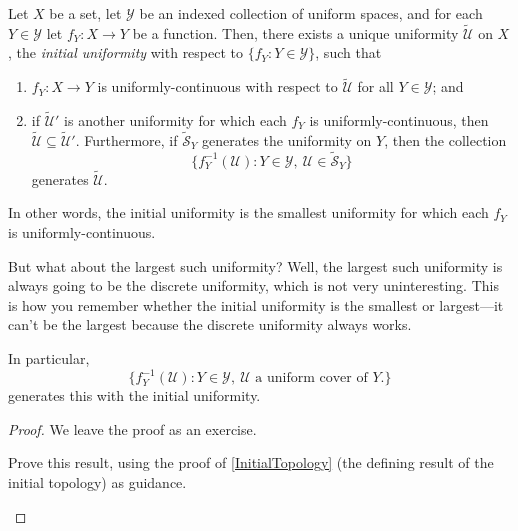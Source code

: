\begin{prp}\label{InitialUniformity}
Let $X$ be a set, let $\mathcal{Y}$ be an indexed collection of uniform spaces, and for each $Y\in \mathcal{Y}$ let $f_Y:X\rightarrow Y$ be a function.  Then, there exists a unique uniformity $\widetilde{\mathcal{U}}$ on $X$, the \emph{initial uniformity} with respect to $\{ f_Y:Y\in \mathcal{Y}\}$, such that
\begin{enumerate}
\item $f_Y:X\rightarrow Y$ is uniformly-continuous with respect to $\widetilde{\mathcal{U}}$ for all $Y\in \mathcal{Y}$; and
\item if $\widetilde{\mathcal{U}}'$ is another uniformity for which each $f_Y$ is uniformly-continuous, then $\widetilde{\mathcal{U}}\subseteq \widetilde{\mathcal{U}}'$.  Furthermore, if $\widetilde{\mathcal{S}}_Y$ generates the uniformity on $Y$, then the collection
\begin{equation}
\{ f_Y^{-1}(\mathcal{U}):Y\in \mathcal{Y},\ \mathcal{U}\in \widetilde{\mathcal{S}}_Y\}
\end{equation}
generates $\widetilde{\mathcal{U}}$.
\end{enumerate}
\begin{rmk}
In other words, the initial uniformity is the smallest uniformity for which each $f_Y$ is uniformly-continuous.
\end{rmk}
\begin{rmk}
But what about the largest such uniformity?  Well, the largest such uniformity is always going to be the discrete uniformity, which is not very uninteresting.  This is how you remember whether the initial uniformity is the smallest or largest---it can't be the largest because the discrete uniformity always works.
\end{rmk}
\begin{rmk}
In particular,
\begin{equation}
\{ f_Y^{-1}(\mathcal{U}):Y\in \mathcal{Y},\ \mathcal{U}\text{ a uniform cover of }Y\text{.}\}
\end{equation}
generates this with the initial uniformity.
\end{rmk}
\begin{proof}
We leave the proof as an exercise.
\begin{exr}
Prove this result, using the proof of \cref{InitialTopology} (the defining result of the initial topology) as guidance.
\end{exr}
\end{proof}
\end{prp}
